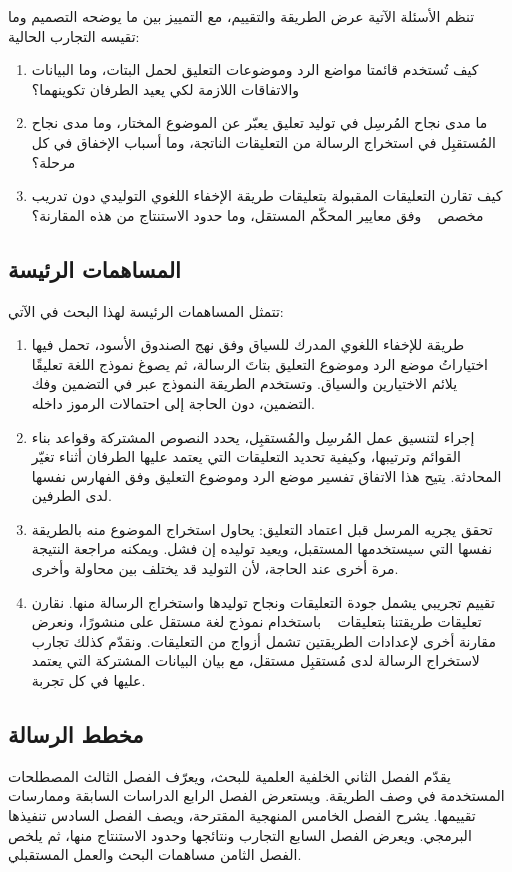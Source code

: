 تنظم الأسئلة الآتية عرض الطريقة والتقييم، مع التمييز بين ما يوضحه التصميم وما تقيسه التجارب الحالية:
\begin{enumerate}
    \item كيف تُستخدم قائمتا مواضع الرد وموضوعات التعليق لحمل البتات، وما البيانات والاتفاقات اللازمة لكي يعيد الطرفان تكوينهما؟
    \item ما مدى نجاح المُرسِل في توليد تعليق يعبّر عن الموضوع المختار، وما مدى نجاح المُستقبِل في استخراج الرسالة من التعليقات الناتجة، وما أسباب الإخفاق في كل مرحلة؟
    \item كيف تقارن التعليقات المقبولة بتعليقات طريقة الإخفاء اللغوي التوليدي دون تدريب مخصص ~\cite{lin2024zero} وفق معايير المحكّم المستقل، وما حدود الاستنتاج من هذه المقارنة؟
\end{enumerate}

\subsection{المساهمات الرئيسة}

تتمثل المساهمات الرئيسة لهذا البحث في الآتي:
\begin{enumerate}
    \item طريقة للإخفاء اللغوي المدرك للسياق وفق نهج الصندوق الأسود، تحمل فيها اختياراتُ موضع الرد وموضوع التعليق بتاتَ الرسالة، ثم يصوغ نموذج اللغة تعليقًا يلائم الاختيارين والسياق. وتستخدم الطريقة النموذج عبر  في التضمين وفك التضمين، دون الحاجة إلى احتمالات الرموز داخله.
    \item إجراء لتنسيق عمل المُرسِل والمُستقبِل، يحدد النصوص المشتركة وقواعد بناء القوائم وترتيبها، وكيفية تحديد التعليقات التي يعتمد عليها الطرفان أثناء تغيّر المحادثة. يتيح هذا الاتفاق تفسير موضع الرد وموضوع التعليق وفق الفهارس نفسها لدى الطرفين.
    \item تحقق يجريه المرسل قبل اعتماد التعليق: يحاول استخراج الموضوع منه بالطريقة نفسها التي سيستخدمها المستقبل، ويعيد توليده إن فشل. ويمكنه مراجعة النتيجة مرة أخرى عند الحاجة، لأن التوليد قد يختلف بين محاولة وأخرى.
    \item تقييم تجريبي يشمل جودة التعليقات ونجاح توليدها واستخراج الرسالة منها. نقارن تعليقات طريقتنا بتعليقات ~\cite{lin2024zero} باستخدام نموذج لغة مستقل على  منشورًا، ونعرض مقارنة أخرى لإعدادات الطريقتين تشمل  أزواج من التعليقات. ونقدّم كذلك تجارب لاستخراج الرسالة لدى مُستقبِل مستقل، مع بيان البيانات المشتركة التي يعتمد عليها في كل تجربة.
\end{enumerate}

\subsection{مخطط الرسالة}

يقدّم الفصل الثاني الخلفية العلمية للبحث، ويعرّف الفصل الثالث المصطلحات المستخدمة في وصف الطريقة. ويستعرض الفصل الرابع الدراسات السابقة وممارسات تقييمها.
يشرح الفصل الخامس المنهجية المقترحة، ويصف الفصل السادس تنفيذها البرمجي. ويعرض الفصل السابع التجارب ونتائجها وحدود الاستنتاج منها، ثم يلخص الفصل الثامن مساهمات البحث والعمل المستقبلي.

